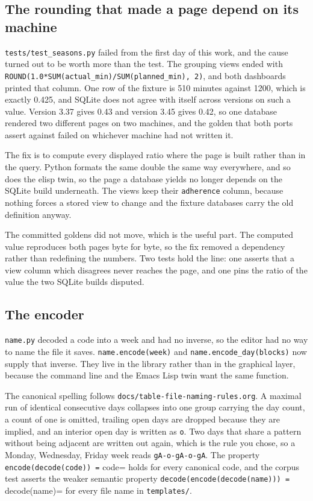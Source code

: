 \documentclass[11pt]{article}
\begin{document}
\subsection{The rounding that made a page depend on its machine}
\label{sec:org82a33f5}

\texttt{tests/test\_seasons.py} failed from the first day of this work, and the cause
turned out to be worth more than the test. The grouping views ended with
\texttt{ROUND(1.0*SUM(actual\_min)/SUM(planned\_min), 2)}, and both dashboards printed
that column. One row of the fixture is 510 minutes against 1200, which is
exactly 0.425, and SQLite does not agree with itself across versions on such a
value. Version 3.37 gives 0.43 and version 3.45 gives 0.42, so one database
rendered two different pages on two machines, and the golden that both ports
assert against failed on whichever machine had not written it.

The fix is to compute every displayed ratio where the page is built rather than
in the query. Python formats the same double the same way everywhere, and so
does the elisp twin, so the page a database yields no longer depends on the
SQLite build underneath. The views keep their \texttt{adherence} column, because
nothing forces a stored view to change and the fixture databases carry the old
definition anyway.

The committed goldens did not move, which is the useful part. The computed value
reproduces both pages byte for byte, so the fix removed a dependency rather than
redefining the numbers. Two tests hold the line: one asserts that a view column
which disagrees never reaches the page, and one pins the ratio of the value the
two SQLite builds disputed.
\subsection{The encoder}
\label{sec:org30ee4eb}

\texttt{name.py} decoded a code into a week and had no inverse, so the editor had no
way to name the file it saves. \texttt{name.encode(week)} and \texttt{name.encode\_day(blocks)}
now supply that inverse. They live in the library rather than in the graphical
layer, because the command line and the Emacs Lisp twin want the same function.

The canonical spelling follows \texttt{docs/table-file-naming-rules.org}. A maximal run
of identical consecutive days collapses into one group carrying the day count, a
count of one is omitted, trailing open days are dropped because they are
implied, and an interior open day is written as \texttt{o}. Two days that share a
pattern without being adjacent are written out again, which is the rule you
chose, so a Monday, Wednesday, Friday week reads \texttt{gA-o-gA-o-gA}. The property
\texttt{encode(decode(code)) =} code= holds for every canonical code, and the corpus
test asserts the weaker semantic property \texttt{decode(encode(decode(name))) =}
decode(name)= for every file name in \texttt{templates/}.
\end{document}
